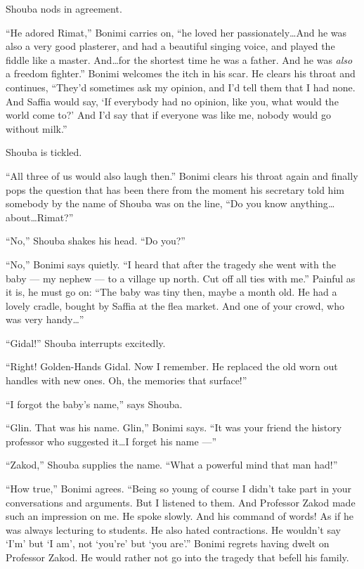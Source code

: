\documentclass[twoside,11pt,openany]{book}
\begin{document}
Shouba nods in agreement.

``He adored Rimat,'' Bonimi carries on,
``he loved her passionately{\ldots}\linebreak[0]And he
was also a very good plasterer, and had a beautiful singing voice, and played the fiddle like a master. And{\ldots}for
the shortest time he was a father. And he was \textit{also} a freedom fighter.''
Bonimi welcomes the
itch in his scar. He clears his throat and continues, ``They'd sometimes ask my opinion, and I'd tell
them that I had none. And Saffia would say, `If everybody had no opinion, like you, what would the world come to?' And
I'd say that if everyone was like me, nobody would go without milk.''

Shouba is tickled.

``All three of us would also laugh then.'' Bonimi clears his throat again and finally pops the
question that has been there from the moment his secretary told him somebody by the name of Shouba was on the line,
``Do you know anything{\ldots}about{\ldots}Rimat?''

``No,'' Shouba shakes his head. ``Do you?''

``No,'' Bonimi says quietly. ``I heard that after the tragedy she went with the
baby --- my nephew --- to a village up north. Cut off all ties with me.'' Painful as it is, he must go on: ``The baby was
tiny then, maybe a month old. He had a lovely cradle, bought by Saffia at the flea market. And one of your crowd, who
was very handy{\ldots}''

``Gidal!'' Shouba interrupts excitedly.

``Right! Golden-Hands Gidal. Now I remember. He replaced the old worn out handles with new ones. Oh, the
memories that surface!''

``I forgot the baby's name,'' says Shouba.

``Glin. That was his name. Glin,'' Bonimi says. ``It was your friend the history
professor who suggested it{\ldots}I forget his name ---''

``Zakod,'' Shouba supplies the name. ``What a powerful mind that man
had!''

``How true,'' Bonimi agrees. ``Being so young of course I didn't take part in
your conversations and arguments. But I listened to them. And Professor Zakod made such an impression on me. He spoke
slowly. And his command of words! As if he was always lecturing to students. He also hated contractions. He wouldn't
say `I'm' but `I am', not `you're' but `you are'.'' Bonimi regrets having dwelt on Professor Zakod. He
would rather not go into the tragedy that befell his family.
\end{document}
